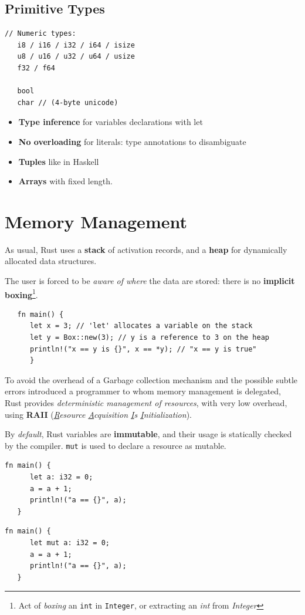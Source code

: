 \subsection{Primitive Types}
\begin{lstlisting}[caption={Rust primitive types}]
   // Numeric types:
   i8 / i16 / i32 / i64 / isize
   u8 / u16 / u32 / u64 / usize
   f32 / f64
   
   bool
   char // (4-byte unicode)
\end{lstlisting}
\begin{itemize}
\item \textbf{Type inference} for variables declarations with let
\item \textbf{No overloading} for literals: type annotations to disambiguate
\item \textbf{Tuples} like in Haskell
\item \textbf{Arrays} with fixed length. 
\end{itemize}

\section{Memory Management}
As usual, Rust uses a \textbf{stack} of activation records, and a \textbf{heap} for dynamically allocated data structures.

The user is forced to be \textit{aware of where} the data are stored: 
there is no \textbf{implicit boxing}\footnote{Act of \textit{boxing} an \texttt{int} in \texttt{Integer}, or extracting an \textit{int} from \textit{Integer}}.

\begin{lstlisting}
   fn main() {
      let x = 3; // 'let' allocates a variable on the stack
      let y = Box::new(3); // y is a reference to 3 on the heap
      println!("x == y is {}", x == *y); // "x == y is true"
      }
\end{lstlisting}

To avoid the overhead of a Garbage collection mechanism and the possible subtle errors introduced a programmer to whom memory management is delegated, Rust provides \textit{deterministic management of
resources}, with very low overhead, using \textbf{RAII} (\textit{\underline{R}esource \underline{A}cquisition \underline{I}s \underline{I}nitialization}).
\nl

By \textit{default}, Rust variables are \textbf{immutable}, and their usage is statically checked by the compiler.
\lstinline|mut| is used to declare a resource as mutable.
\begin{paracol}{2}
\begin{lstlisting}[caption={Compilation \textit{error}}]
   fn main() {
      let a: i32 = 0;
      a = a + 1;
      println!("a == {}", a);
   }
\end{lstlisting}
\switchcolumn
\begin{lstlisting}[caption={Compilation \checkmark}]
   fn main() {
      let mut a: i32 = 0;
      a = a + 1;
      println!("a == {}", a);
   }
\end{lstlisting}
\end{paracol}

